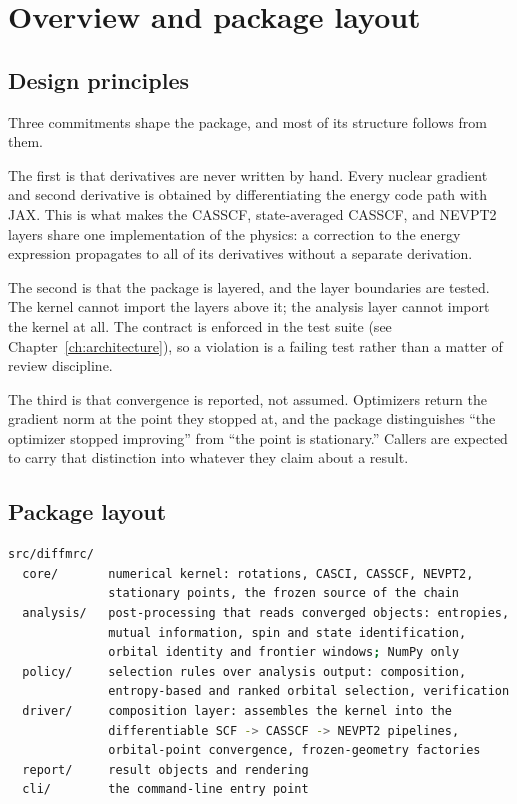 \chapter{Overview and package layout}
\label{ch:overview}

\section{Design principles}

Three commitments shape the package, and most of its structure follows
from them.

The first is that derivatives are never written by hand.  Every nuclear
gradient and second derivative is obtained by differentiating the
energy code path with JAX.  This is what makes the CASSCF, state-averaged
CASSCF, and NEVPT2 layers share one implementation of the physics: a
correction to the energy expression propagates to all of its derivatives
without a separate derivation.

The second is that the package is layered, and the layer boundaries are
tested.  The kernel cannot import the layers above it; the analysis
layer cannot import the kernel at all.  The contract is enforced in the
test suite (see Chapter~\ref{ch:architecture}), so a violation is a
failing test rather than a matter of review discipline.

The third is that convergence is reported, not assumed.  Optimizers
return the gradient norm at the point they stopped at, and the package
distinguishes ``the optimizer stopped improving'' from ``the point is
stationary.''  Callers are expected to carry that distinction into
whatever they claim about a result.

\section{Package layout}

\begin{lstlisting}[language=bash]
src/diffmrc/
  core/       numerical kernel: rotations, CASCI, CASSCF, NEVPT2,
              stationary points, the frozen source of the chain
  analysis/   post-processing that reads converged objects: entropies,
              mutual information, spin and state identification,
              orbital identity and frontier windows; NumPy only
  policy/     selection rules over analysis output: composition,
              entropy-based and ranked orbital selection, verification
  driver/     composition layer: assembles the kernel into the
              differentiable SCF -> CASSCF -> NEVPT2 pipelines,
              orbital-point convergence, frozen-geometry factories
  report/     result objects and rendering
  cli/        the command-line entry point
\end{lstlisting}

